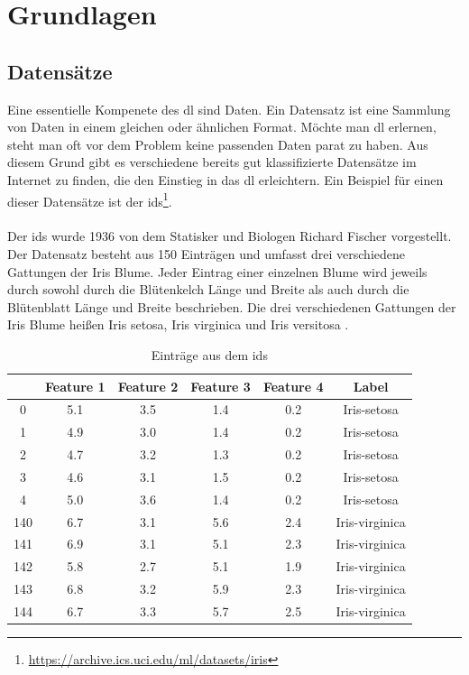 \documentclass[conference, german]{IEEEtran}
\begin{document}
\section{Grundlagen}
\subsection{Datensätze}
Eine essentielle Kompenete des \ac{dl} sind Daten.
Ein Datensatz ist eine Sammlung von Daten in einem gleichen oder ähnlichen Format.
Möchte man \ac{dl} erlernen, steht man oft vor dem Problem keine passenden Daten parat zu haben.
Aus diesem Grund gibt es verschiedene bereits gut klassifizierte Datensätze im Internet zu finden, die den Einstieg in das \ac{dl} erleichtern. 
Ein Beispiel für einen dieser Datensätze ist der \ac{ids}\footnote{\url{https://archive.ics.uci.edu/ml/datasets/iris}}.
\\\\
Der \ac{ids} wurde 1936 von dem Statisker und Biologen Richard Fischer vorgestellt.
Der Datensatz besteht aus 150 Einträgen und umfasst drei verschiedene Gattungen der Iris Blume.
Jeder Eintrag einer einzelnen Blume wird jeweils durch sowohl durch die Blütenkelch Länge und Breite als auch durch die Blütenblatt Länge und Breite beschrieben.
Die drei verschiedenen Gattungen der Iris Blume heißen Iris setosa, Iris virginica und Iris versitosa \citep[vgl.][]{WIKI01}.
\begin{table}
	\caption{Einträge aus dem \ac{ids}}
	\label{table:ids}
	\centering
	\begin{tabular}{c c c c c c}
	\toprule
	{} &    Feature 1 & Feature 2 & Feature 3 & Feature 4 & Label \\
	\midrule
	0 &  5.1 &  3.5 &  1.4 &  0.2 &  Iris-setosa \\
	1 &  4.9 &  3.0 &  1.4 &  0.2 &  Iris-setosa \\
	2 &  4.7 &  3.2 &  1.3 &  0.2 &  Iris-setosa \\
	3 &  4.6 &  3.1 &  1.5 &  0.2 &  Iris-setosa \\
	4 &  5.0 &  3.6 &  1.4 &  0.2 &  Iris-setosa \\
	\midrule
	140 &  6.7 &  3.1 &  5.6 &  2.4 &  Iris-virginica \\
	141 &  6.9 &  3.1 &  5.1 &  2.3 &  Iris-virginica \\
	142 &  5.8 &  2.7 &  5.1 &  1.9 &  Iris-virginica \\
	143 &  6.8 &  3.2 &  5.9 &  2.3 &  Iris-virginica \\
	144 &  6.7 &  3.3 &  5.7 &  2.5 &  Iris-virginica \\
	\bottomrule
\end{tabular}
\end{table}
\end{document}
